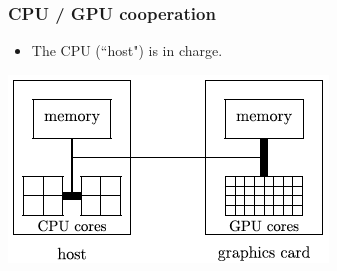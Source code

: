 \documentclass[handout]{beamer}
\numberwithin{equation}{section}
\begin{document}
\begin{frame}
\frametitle{CPU / GPU cooperation}

\begin{itemize}
\item The CPU (``host") is in charge.
\end{itemize}

\begin{center}
\includegraphics[scale=.8]{../../fig/communication.png}
\end{center}
\end{frame}
\end{document}
